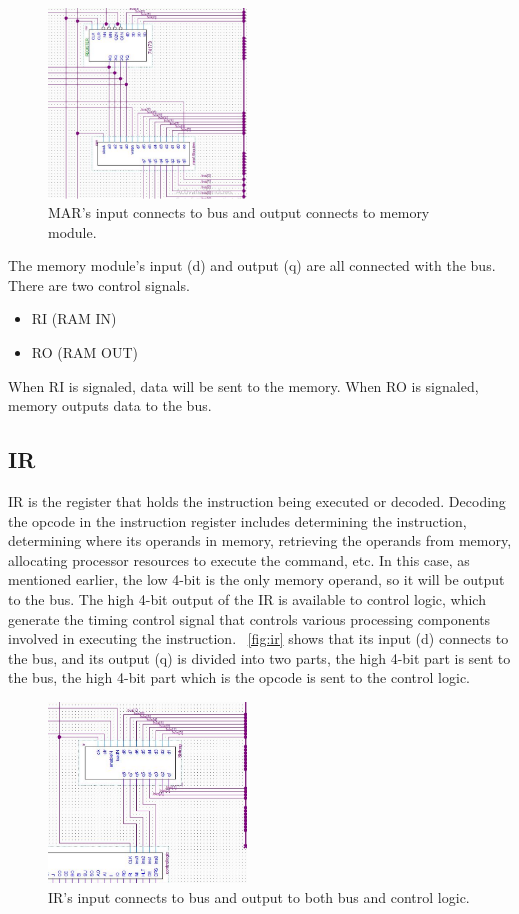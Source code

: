 \begin{figure}[th]
	\includegraphics[width=0.47\textwidth]{figures/marmem}
	\centering
	\caption{MAR's input connects to bus and output connects to memory module.}
	\label{fig:marmem}
\end{figure}

The memory module's input (d) and output (q) are all connected with the bus. There are two control signals.

\begin{itemize}
	\item RI (RAM IN)
	\item RO (RAM OUT)
\end{itemize}

When RI is signaled, data will be sent to the memory. When RO is signaled, memory outputs data to the bus.


\subsection{IR}
IR is the register that holds the instruction being executed or decoded. Decoding the opcode in the instruction register includes determining the instruction, determining where its operands in memory, retrieving the operands from memory, allocating processor resources to execute the command, etc. In this case, as mentioned earlier, the low 4-bit is the only memory operand, so it will be output to the bus. The high 4-bit output of the IR is available to control logic, which generate the timing control signal that controls various processing components involved in executing the instruction. ~\autoref{fig:ir} shows that its input (d) connects to the bus, and its output (q) is divided into two parts, the high 4-bit part is sent to the bus, the high 4-bit part which is the opcode is sent to the control logic.

\begin{figure}[th]
	\includegraphics[width=0.47\textwidth]{figures/ir}
	\centering
	\caption{IR's input connects to bus and output to both bus and control logic.}
	\label{fig:ir}
\end{figure}

